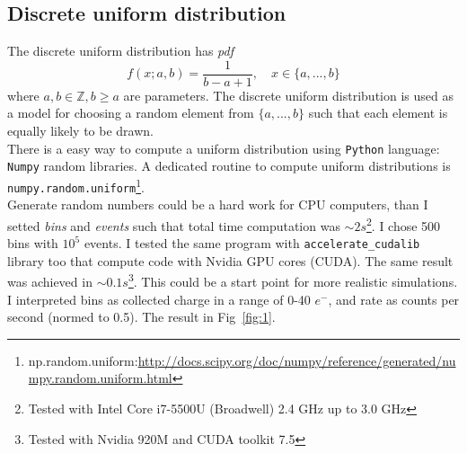 \documentclass[10pt,a4paper, openany]{book}
\begin{document}
\subsection{Discrete uniform distribution}
The discrete uniform distribution has \emph{pdf} 
\begin{equation}
f(x;a,b) =  \frac{1}{b-a+1}, \quad x \in \{ a, ..., b\}
\end{equation}
where $a,b \in \mathbb{Z}, b\geq a$ are parameters. The discrete uniform distribution is used as a model for choosing a random element from $\{a,...,b\}$ such that each element is equally likely to be drawn.\\
There is a easy way to compute a uniform distribution using \verb|Python| language: \verb|Numpy| random libraries. A dedicated routine to compute uniform distributions is \verb|numpy.random.uniform|\footnote{np.random.uniform:\url{http://docs.scipy.org/doc/numpy/reference/generated/numpy.random.uniform.html}}.\\
Generate random numbers could be a hard work for CPU computers, than I setted \emph{bins} and \emph{events} such that total time computation was $\sim 2 s$\footnote{Tested with Intel Core i7-5500U (Broadwell) 2.4 GHz up to 3.0 GHz}. I chose 500 bins with $10^5$ events. I tested the same program with \verb|accelerate_cudalib| library too that compute code with Nvidia GPU cores (CUDA). The same result was achieved in $\sim 0.1 s$\footnote{Tested with Nvidia 920M and CUDA toolkit 7.5}. This could be a start point for more realistic simulations.\\
I interpreted bins as collected charge in a range of 0-40 $e^-$, and rate as counts per second (normed to 0.5). The result in Fig~\ref{fig:1}.
\end{document}
